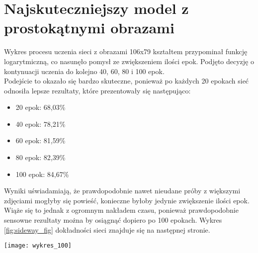 \section{Najskuteczniejszy model z prostokątnymi obrazami}
Wykres procesu uczenia sieci z obrazami 106x79 kształtem przypominał funkcję logarytmiczną,
co nasunęło pomysł ze zwiększeniem ilości epok. Podjęto decyzję o kontynuacji uczenia
do kolejno 40, 60, 80 i 100 epok.\\
Podejście to okazało się bardzo skuteczne, ponieważ po każdych 20 epokach
sieć odnosiła lepsze rezultaty, które prezentowały się następująco:\\
\begin{itemize}
\item  20 epok: 68,03\%\\
\item  40 epok: 78,21\%\\
\item  60 epok: 81,59\%\\
\item  80 epok: 82,39\%\\
\item  100 epok: 84,67\%\\
\end{itemize}
Wyniki uświadamiają, że prawdopodobnie nawet nieudane próby z większymi zdjęciami
mogłyby się powieść, konieczne byłoby jedynie zwiększenie ilości epok. Wiąże się to jednak
z ogromnym nakładem czasu, ponieważ prawdopodobnie sensowne rezultaty można by osiągnąć
dopiero po 100 epokach. Wykres \ref{fig:sideway_fig} dokładności sieci znajduje się na następnej stronie.

\begin{sidewaysfigure}
\texttt{[image: wykres\_100]}
\caption{Wykres uczenia przez 100 epok}
\label{fig:sideway_fig}
\end{sidewaysfigure}
